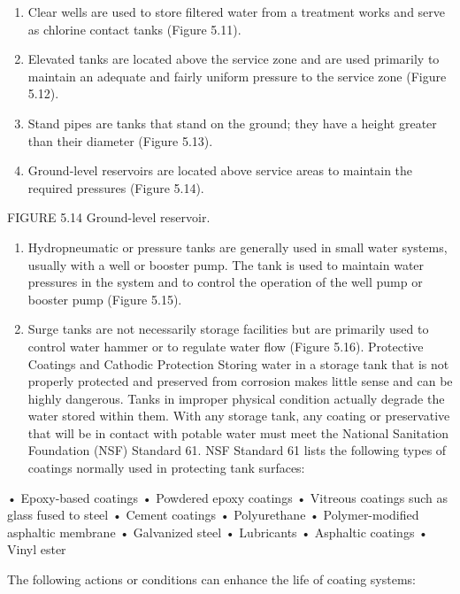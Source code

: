 \documentclass{article}
\begin{document}
\begin{enumerate}
\def\labelenumi{\arabic{enumi}.}
\tightlist
\item
  Clear wells are used to store filtered water from a treatment works
  and serve as chlorine contact tanks (Figure 5.11).
\item
  Elevated tanks are located above the service zone and are used
  primarily to maintain an adequate and fairly uniform pressure to the
  service zone (Figure 5.12).
\item
  Stand pipes are tanks that stand on the ground; they have a height
  greater than their diameter (Figure 5.13).
\item
  Ground-level reservoirs are located above service areas to maintain
  the required pressures (Figure 5.14).
\end{enumerate}

FIGURE 5.14 Ground-level reservoir.

\begin{enumerate}
\def\labelenumi{\arabic{enumi}.}
\setcounter{enumi}{4}
\tightlist
\item
  Hydropneumatic or pressure tanks are generally used in small water
  systems, usually with a well or booster pump. The tank is used to
  maintain water pressures in the system and to control the operation of
  the well pump or booster pump (Figure 5.15).
\item
  Surge tanks are not necessarily storage facilities but are primarily
  used to control water hammer or to regulate water flow (Figure 5.16).
  Protective Coatings and Cathodic Protection Storing water in a storage
  tank that is not properly protected and preserved from corrosion makes
  little sense and can be highly dangerous. Tanks in improper physical
  condition actually degrade the water stored within them. With any
  storage tank, any coating or preservative that will be in contact with
  potable water must meet the National Sanitation Foundation (NSF)
  Standard 61. NSF Standard 61 lists the following types of coatings
  normally used in protecting tank surfaces:
\end{enumerate}

• Epoxy-based coatings • Powdered epoxy coatings • Vitreous coatings
such as glass fused to steel • Cement coatings • Polyurethane •
Polymer-modified asphaltic membrane • Galvanized steel • Lubricants •
Asphaltic coatings • Vinyl ester

The following actions or conditions can enhance the life of coating
systems:
\end{document}

